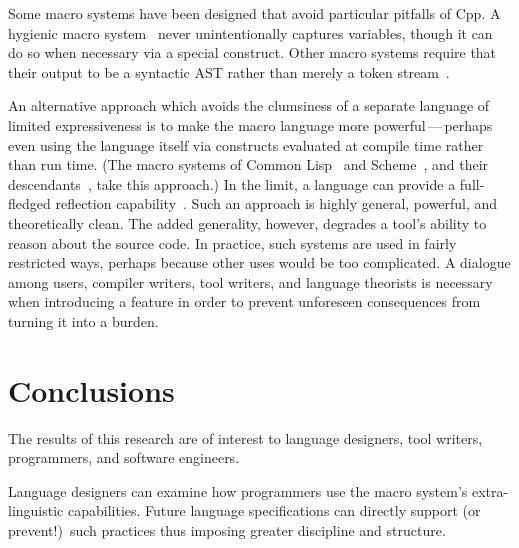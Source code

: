 \documentclass[10pt]{article}
\begin{document}
Some macro systems have been designed that avoid particular pitfalls of Cpp.
A hygienic macro system~\cite{lfp86*151} never unintentionally captures
variables, though it can do so when necessary via a special construct.
Other macro systems require that their output to be a syntactic AST rather
than merely a token stream~\cite{WeiseC93}.

An alternative approach which avoids the clumsiness of a separate language
of limited expressiveness is to make the macro language more
powerful\,---\,perhaps even using the language itself via constructs
evaluated at compile time rather than run time.  (The macro systems of
Common Lisp~\cite{commonlisp:languagespec} and
Scheme~\cite{KelseyCR98}, and their descendants~\cite{WeiseC93}, take
this approach.)  In the limit, a language can provide a full-fledged
reflection capability~\cite{kicz91}.  Such an approach is highly general,
powerful, and theoretically clean.  The added generality, however, degrades
a tool's ability to reason about the source code.  In practice, such
systems are used in fairly restricted ways, perhaps because other uses
would be too complicated.  A dialogue among users, compiler writers, tool
writers, and language theorists is necessary when introducing a feature in
order to prevent unforeseen consequences from turning it into a burden.



\section{Conclusions}
\label{sec:conclusion}




The results of this research are of interest to language designers, tool
writers, programmers, and software engineers.

Language designers can examine how programmers use the macro system's
extra-linguistic capabilities.  Future language specifications can
directly support (or prevent!)\ such practices thus imposing greater
discipline and structure.
\end{document}

